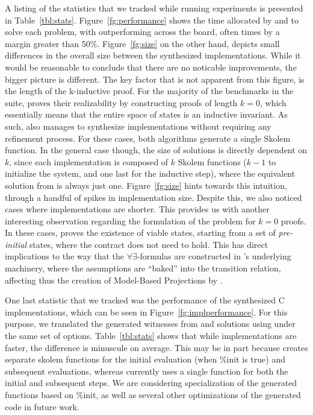 A listing of the statistics that we tracked while running experiments is
presented in Table~\ref{tbl:stats}.
Figure~\ref{fg:performance} shows the time allocated by \jsyn and \jsynvg to solve each problem, with \jsynvg
outperforming \jsyn across the board, often times by a margin greater than
50\%. Figure~\ref{fg:size} on the other hand, depicts small differences in the
overall size between the synthesized implementations. While it would be
reasonable to conclude that there are no noticable improvements, the bigger
picture is different. The key factor that is not apparent from this figure, is the length of the k-inductive proof. For the majority of the benchmarks in the suite, \jsyn proves their realizability by constructing proofs of length $k=0$, which essentially means
that the entire space of states is an inductive invariant. As such, \jsynvg
also manages to synthesize implementations without requiring any refinement
process. For these cases, both algorithms generate a single Skolem function. In the general case though, the size of \jsyn solutions is directly
dependent on $k$, since each implementation is composed of $k$ Skolem
functions ($k-1$ to initialize the system, and one last for the inductive step),
where the equivalent solution from \jsynvg is always just one.
Figure~\ref{fg:size} hints towards this intuition, through a handful of spikes
in \jsyn implementation size. Despite this, we also noticed cases where \jsyn
implementations are shorter. This provides us with another interesting
observation regarding the formulation of the problem for $k=0$ proofs. In
these cases, \jsyn proves the existence of viable states, starting from a set
of \textit{pre-initial} states, where the contract does not need to hold. This
has direct implications to the way that the $\forall\exists$-formulas are
constructed in \jsyn's underlying machinery, where the assumptions are ``baked''
into the transition relation, affecting thus the creation of Model-Based
Projections by \aeval.

 One last statistic that we tracked was the performance of the synthesized C
 implementations, which can be seen in Figure~\ref{fg:implperformance}. For this purpose, we translated the
 generated witnesses from \jsyn and \jsynvg solutions using
 \smtlibtoc under the same set of options. Table~\ref{tbl:stats} shows that
 while \jsyn implementations are faster, the difference is minuscule on average.
This may be in part because \jsyn creates separate skolem functions for the initial evaluation (when \%init is true) and subsequent evaluations, whereas currently \jsynvg uses a single function for both the initial and subsequent steps.  We are considering specialization of the generated \jsynvg functions based on \%init, as well as several other optimizations of the generated code in future work.


